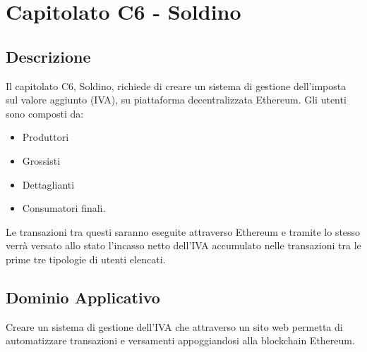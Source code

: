 \clearpage
\section{Capitolato C6 - Soldino}
\subsection{Descrizione}
Il capitolato C6, Soldino, richiede di creare un sistema di gestione dell'imposta sul valore aggiunto (IVA), su piattaforma decentralizzata Ethereum. Gli utenti sono composti da:
\begin{itemize}
\item Produttori 
\item Grossisti 
\item Dettaglianti 
\item Consumatori finali.
\end{itemize}
Le transazioni tra questi saranno eseguite attraverso Ethereum e tramite lo stesso verrà versato allo stato l'incasso netto dell'IVA accumulato nelle transazioni tra le prime tre tipologie di utenti elencati.

\subsection{Dominio Applicativo}
Creare un sistema di gestione dell'IVA che attraverso un sito web permetta di automatizzare transazioni e versamenti appoggiandosi alla blockchain Ethereum.

